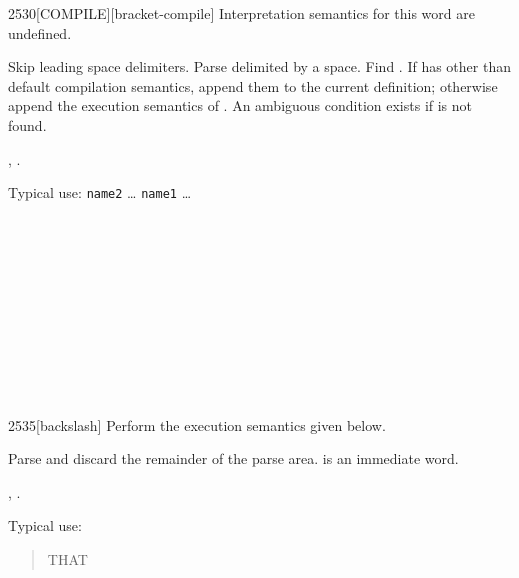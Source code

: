 \begin{worddef}{2530}{[COMPILE]}[bracket-compile]
\interpret
	Interpretation semantics for this word are undefined.

\compile

	Skip leading space delimiters. Parse  delimited by
	a space. Find . If  has other than default
	compilation semantics, append them to the current definition;
	otherwise append the execution semantics of . An
	ambiguous condition exists if  is not found.

\see {},
	.

	\begin{rationale} %
		Typical use:
			\word{:} \texttt{name2} {\ldots}
				\word{[COMPILE]} \texttt{name1}
			{\ldots} \word{;} ~ 
	\end{rationale}

	\begin{testing}
		 \\
		 \\

		 \\
		\test{\word{:} [c2] \word{[COMPILE]} [c1] \word{;}}{} \\

		 \\
		 \\
		 \\
		 \\
	\end{testing}
\end{worddef}


\begin{worddef}[bs]{2535}{\bs}[backslash]
\compile
	Perform the execution semantics given below.

\execute

	Parse and discard the remainder of the parse area.
	 is an immediate word.

\see {},
	.

	\begin{rationale} %
		Typical use:
		\begin{quote}  THAT
			~  ~ 
		\end{quote}
	\end{rationale}
\end{worddef}
